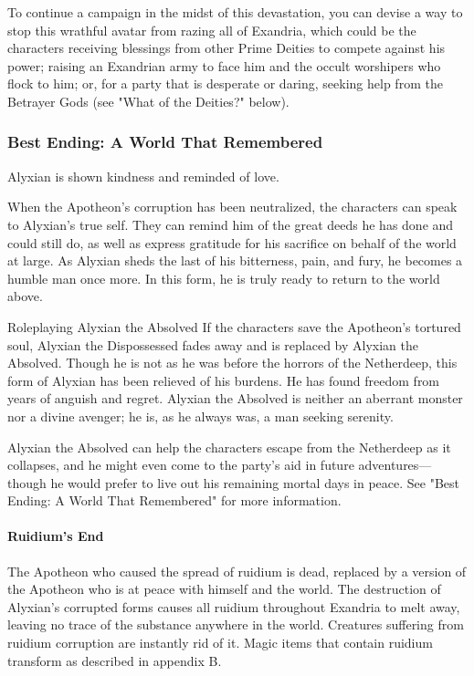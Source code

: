 \documentclass[10pt,a4paper,twoside,bg=print,twocolumn,openany,nodeprecatedcode]{dndbook}
\begin{document}
To continue a campaign in the midst of this devastation, you can devise a way to stop this wrathful avatar from razing all of Exandria, which could be the characters receiving blessings from other Prime Deities to compete against his power; raising an Exandrian army to face him and the occult worshipers who flock to him; or, for a party that is desperate or daring, seeking help from the Betrayer Gods (see "What of the Deities?" below).

\subsubsection{Best Ending: A World That Remembered}
Alyxian is shown kindness and reminded of love.

When the Apotheon's corruption has been neutralized, the characters can speak to Alyxian's true self. They can remind him of the great deeds he has done and could still do, as well as express gratitude for his sacrifice on behalf of the world at large. As Alyxian sheds the last of his bitterness, pain, and fury, he becomes a humble man once more. In this form, he is truly ready to return to the world above.

\begin{DndSidebar}[float=!b]{Roleplaying Alyxian the Absolved}
If the characters save the Apotheon's tortured soul, Alyxian the Dispossessed fades away and is replaced by Alyxian the Absolved. Though he is not as he was before the horrors of the Netherdeep, this form of Alyxian has been relieved of his burdens. He has found freedom from years of anguish and regret. Alyxian the Absolved is neither an aberrant monster nor a divine avenger; he is, as he always was, a man seeking serenity.



Alyxian the Absolved can help the characters escape from the Netherdeep as it collapses, and he might even come to the party's aid in future adventures—though he would prefer to live out his remaining mortal days in peace. See "Best Ending: A World That Remembered" for more information.



\end{DndSidebar}

\paragraph{Ruidium's End}
The Apotheon who caused the spread of ruidium is dead, replaced by a version of the Apotheon who is at peace with himself and the world. The destruction of Alyxian's corrupted forms causes all ruidium throughout Exandria to melt away, leaving no trace of the substance anywhere in the world. Creatures suffering from ruidium corruption are instantly rid of it. Magic items that contain ruidium transform as described in appendix B.
\end{document}
